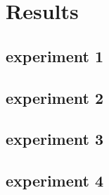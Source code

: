 \chapter{Results}

\section{experiment 1}

\section{experiment 2}

\section{experiment 3}

\section{experiment 4}
